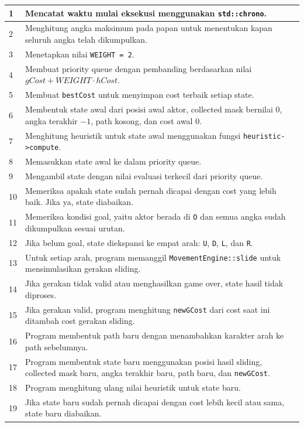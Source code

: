 \begin{longtable}{|p{1.2cm}|p{12.8cm}|}
	1 & Mencatat waktu mulai eksekusi menggunakan \texttt{std::chrono}. \\
	\hline
	2 & Menghitung angka maksimum pada papan untuk menentukan kapan seluruh angka telah dikumpulkan. \\
	\hline
	3 & Menetapkan nilai \texttt{WEIGHT = 2}. \\
	\hline
	4 & Membuat priority queue dengan pembanding berdasarkan nilai $gCost + WEIGHT \cdot hCost$. \\
	\hline
	5 & Membuat \texttt{bestCost} untuk menyimpan cost terbaik setiap state. \\
	\hline
	6 & Membentuk state awal dari posisi awal aktor, collected mask bernilai $0$, angka terakhir $-1$, path kosong, dan cost awal $0$. \\
	\hline
	7 & Menghitung heuristik untuk state awal menggunakan fungsi \texttt{heuristic->compute}. \\
	\hline
	8 & Memasukkan state awal ke dalam priority queue. \\
	\hline
	9 & Mengambil state dengan nilai evaluasi terkecil dari priority queue. \\
	\hline
	10 & Memeriksa apakah state sudah pernah dicapai dengan cost yang lebih baik. Jika ya, state diabaikan. \\
	\hline
	11 & Memeriksa kondisi goal, yaitu aktor berada di \texttt{O} dan semua angka sudah dikumpulkan sesuai urutan. \\
	\hline
	12 & Jika belum goal, state diekspansi ke empat arah: \texttt{U}, \texttt{D}, \texttt{L}, dan \texttt{R}. \\
	\hline
	13 & Untuk setiap arah, program memanggil \texttt{MovementEngine::slide} untuk mensimulasikan gerakan sliding. \\
	\hline
	14 & Jika gerakan tidak valid atau menghasilkan game over, state hasil tidak diproses. \\
	\hline
	15 & Jika gerakan valid, program menghitung \texttt{newGCost} dari cost saat ini ditambah cost gerakan sliding. \\
	\hline
	16 & Program membentuk path baru dengan menambahkan karakter arah ke path sebelumnya. \\
	\hline
	17 & Program membentuk state baru menggunakan posisi hasil sliding, collected mask baru, angka terakhir baru, path baru, dan \texttt{newGCost}. \\
	\hline
	18 & Program menghitung ulang nilai heuristik untuk state baru. \\
	\hline
	19 & Jika state baru sudah pernah dicapai dengan cost lebih kecil atau sama, state baru diabaikan. \\

\end{longtable}
